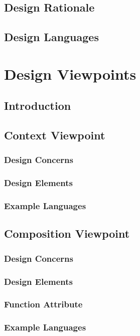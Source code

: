 \documentclass[letterpaper,10pt,titlepage,draftclsnofoot,onecolumn,onesided] {IEEEtran}
\begin{document}
\subsection{Design Rationale}

\subsection{Design Languages}

\section{Design Viewpoints}

\subsection{Introduction}

\subsection{Context Viewpoint}
\subsubsection{Design Concerns}
\subsubsection{Design Elements}
\subsubsection{Example Languages}

\subsection{Composition Viewpoint}
\subsubsection{Design Concerns}
\subsubsection{Design Elements}
\subsubsection{Function Attribute}
\subsubsection{Example Languages}
\end{document}
